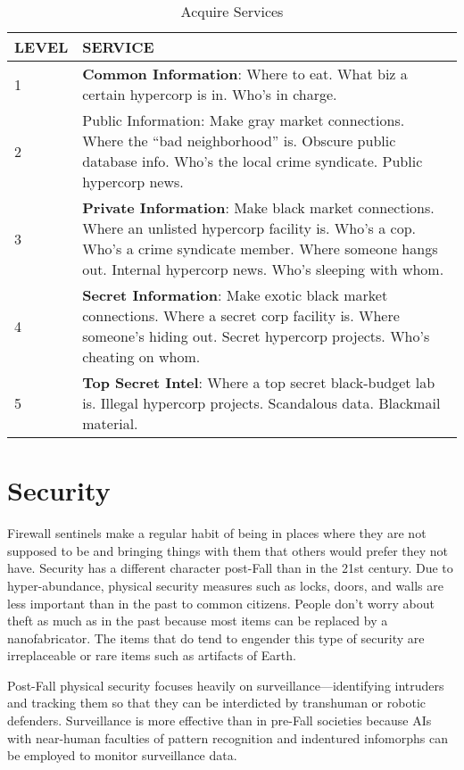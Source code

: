 \begin{table}
\caption{Acquire Services}
\begin{tabularx}{\textwidth}{|l|X|}
\hline
LEVEL & SERVICE \\
\hline
1 & \textbf{Common Information}: Where to eat. What biz a certain hypercorp is in. Who’s in charge. \\
\hline
2 & Public Information: Make gray market connections.  Where the “bad neighborhood” is. Obscure public database info. Who’s the local crime syndicate. Public hypercorp news. \\
\hline
3 & \textbf{Private Information}: Make black market connections.  Where an unlisted hypercorp facility is. Who’s a cop. Who’s a crime syndicate member. Where someone hangs out.  Internal hypercorp news. Who’s sleeping with whom. \\
\hline
4 & \textbf{Secret Information}: Make exotic black market connections. Where a secret corp facility is. Where someone’s hiding out. Secret hypercorp projects. Who’s cheating on whom. \\
\hline
5 & \textbf{Top Secret Intel}: Where a top secret black-budget lab is. Illegal hypercorp projects. Scandalous data.  Blackmail material. \\
\hline
\end{tabularx}
\end{table}



\section{Security}

Firewall sentinels make a regular habit of being in 
places where they are not supposed to be and bringing
things with them that others would prefer they
not have. Security has a different character post-Fall 
than in the 21st century. Due to hyper-abundance, 
physical security measures such as locks, doors, and 
walls are less important than in the past to common 
citizens. People don't worry about theft as much as 
in the past because most items can be replaced by a 
nanofabricator. The items that do tend to engender 
this type of security are irreplaceable or rare items 
such as artifacts of Earth.

Post-Fall physical security focuses heavily on 
surveillance—identifying intruders and tracking 
them so that they can be interdicted by transhuman 
or robotic defenders. Surveillance is more effective
than in pre-Fall societies because AIs with
near-human faculties of pattern recognition and 
indentured infomorphs can be employed to monitor 
surveillance data.

